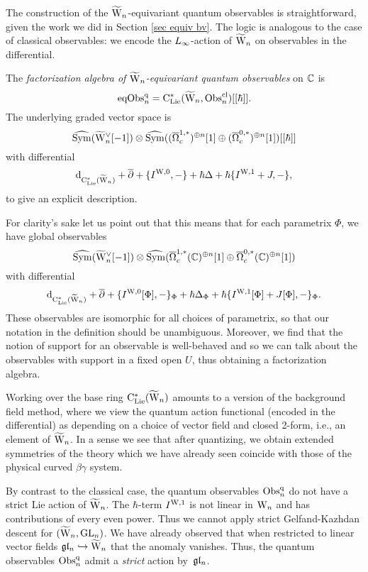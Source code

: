 The construction of the $\widetilde{{{\rm W}}}_n$-equivariant quantum observables is straightforward,
given the work we did in Section \ref{sec equiv bv}.
The logic is analogous to the case of classical observables:
we encode the $\L8$-action of $\widetilde{{{\rm W}}}_n$ on observables in the differential.

\begin{dfn}
The \emph{factorization algebra of $\widetilde{{{\rm W}}}_n$-equivariant quantum observables} on $\mathbb C$ is  
\[
{\rm eqObs}^{\rm q}_n = {\rm C}_{\rm Lie}^*(\widetilde{{{\rm W}}}_n, {\rm Obs}^{\rm cl}_n)[[\hbar]].
\]
The underlying graded vector space is
\[
\widehat{{\rm Sym}}(\widetilde{{{\rm W}}}_n^\vee[-1]) \otimes \widehat{{\rm Sym}}((\overline{\Omega}^{1,*}_c)^{\oplus n}[1] \oplus (\overline{\Omega}^{0,*}_c)^{\oplus n}[1])[[\hbar]]
\]
with differential 
\[
{\rm d}_{{\rm C}_{\rm Lie}^*(\widetilde{{{\rm W}}}_n)} + \overline{\partial} + \{I^{\rm W,0},-\} + \hbar \Delta + \hbar \{I^{\rm W,1}+J,-\},
\]
to give an explicit description.
\end{dfn}

For clarity's sake let us point out that this means that for each parametrix $\Phi$, we have global observables
\[
\widehat{{\rm Sym}}(\widetilde{{{\rm W}}}_n^\vee[-1]) \otimes \widehat{{\rm Sym}}(\overline{\Omega}^{1,*}_c(\mathbb C)^{\oplus n}[1] \oplus \overline{\Omega}^{0,*}_c(\mathbb C)^{\oplus n}[1])
\]
with differential 
\[
{\rm d}_{{\rm C}_{\rm Lie}^*(\widetilde{{{\rm W}}}_n)} + \overline{\partial} + \{I^{{\rm W},0}[\Phi],-\}_\Phi + \hbar \Delta_\Phi + \hbar \{I^{{\rm W},1}[\Phi]+J[\Phi],-\}_\Phi.
\]
These observables are isomorphic for all choices of parametrix,
so that our notation in the definition should be unambiguous.
Moreover, we find that the notion of support for an observable is well-behaved 
and so we can talk about the observables with support in a fixed open $U$,
thus obtaining a factorization algebra.

\begin{rmk}
Working over the base ring ${\rm C}_{\rm Lie}^*(\widetilde{{{\rm W}}}_n)$ amounts to a version of the background field method,
where we view the quantum action functional (encoded in the differential) as depending on a choice of vector field and closed 2-form,
i.e., an element of $\widetilde{{{\rm W}}}_n$.
In a sense we see that after quantizing, we obtain extended symmetries
of the theory which we have already seen coincide with those of the
physical curved $\beta\gamma$ system.
\end{rmk}

By contrast to the classical case, the quantum observables ${\rm Obs}^{\rm q}_n$ do not have a strict Lie action of $\widetilde{{{\rm W}}}_n$.
The $\hbar$-term $I^{{\rm W},1}$ is not linear in ${{\rm W}_n}$ and has
contributions of every even power.
Thus we cannot apply strict Gelfand-Kazhdan descent for
$(\widetilde{{{\rm W}}}_n,{\rm GL}_n)$. We have already observed that when restricted to
linear vector fields $\mathfrak{g} \mathfrak{l}_n \hookrightarrow \widetilde{{{\rm W}}}_n$ that the anomaly
vanishes. Thus, the quantum observables ${\rm Obs}^{\rm q}_n$ admit a {\it strict} action by~$\mathfrak{g} \mathfrak{l}_n$.

